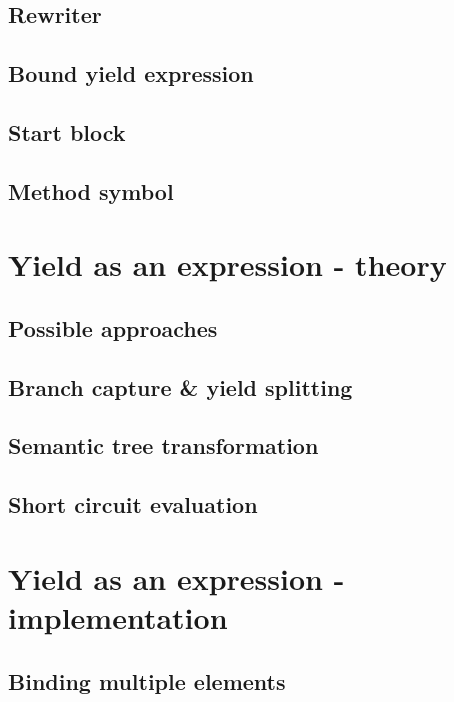 \subsection{Rewriter}

\subsection{Bound yield expression}

\subsection{Start block}

\subsection{Method symbol}

\section{Yield as an expression - theory}

\subsection{Possible approaches}

\subsection{Branch capture \& yield splitting}

\subsection{Semantic tree transformation}

\subsection{Short circuit evaluation}

\section{Yield as an expression - implementation}

\subsection{Binding multiple elements}

